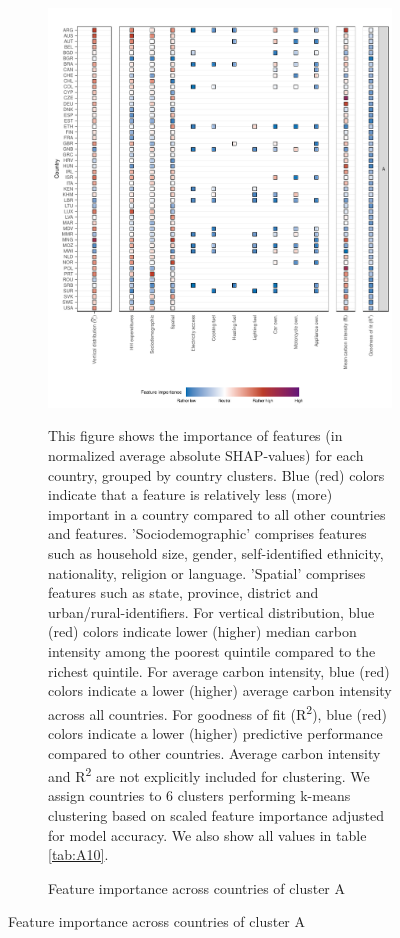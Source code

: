\documentclass[12pt, a4paper]{article}
\newenvironment{subcaption2}
{\strut
\vspace{-5pt}
\begin{minipage}[b]{0.95\textwidth}
  \hspace*{-\parindent}
  \footnotesize}
 {\end{minipage}}
\begin{document}
\clearpage
\begin{figure}[ht!]
    \centering
    \caption{Feature importance across countries by cluster}\label{fig:fig_4}
    \begin{subfigure}[b]{\textwidth}
    \centering
    \caption{Feature importance across countries of cluster A}\label{fig:fig_4_1}
    \includegraphics{1_Figures/Figure 4/Figure_4_Corrected_1.pdf}
     \begin{subcaption2}
    This figure shows the importance of features (in normalized average absolute SHAP-values) for each country, grouped by country clusters. Blue (red) colors indicate that a feature is relatively less (more) important in a country compared to all other countries and features. 'Sociodemographic' comprises features such as household size, gender, self-identified ethnicity, nationality, religion or language. 'Spatial' comprises features such as state, province, district and urban/rural-identifiers. For vertical distribution, blue (red) colors indicate lower (higher) median carbon intensity among the poorest quintile compared to the richest quintile. For average carbon intensity, blue (red) colors indicate a lower (higher) average carbon intensity across all countries. For goodness of fit (R\textsuperscript{2}), blue (red) colors indicate a lower (higher) predictive performance compared to other countries. Average carbon intensity and R\textsuperscript{2} are not explicitly included for clustering.
    We assign countries to 6 clusters performing k-means clustering based on scaled feature importance adjusted for model accuracy. We also show all values in table \ref{tab:A10}.
    \end{subcaption2}
    \end{subfigure}
\end{figure}
\clearpage
\end{document}
